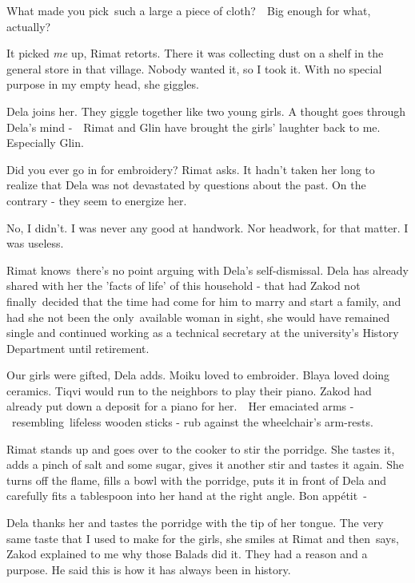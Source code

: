 \documentclass[letterpaper]{article}
\begin{document}
{\textquotedbl}What made you pick~such a large a piece of cloth?\ \ Big enough for what, actually?{\textquotedbl}

{\textquotedbl}It picked \textit{me} up,{\textquotedbl} Rimat retorts. {\textquotedbl}There it was collecting dust on a
shelf in the general store in that village. Nobody wanted it, so I took it. With no special purpose in my empty
head,{\textquotedbl} she giggles.

Dela joins her. They giggle together like two young girls. A thought goes through Dela's mind -\ \ Rimat and Glin have
brought the girls' laughter back to me. Especially Glin. 

{\textquotedbl}Did you ever go in for embroidery?{\textquotedbl} Rimat asks. It hadn't taken her long to realize that
Dela was not devastated by questions about the past. On the contrary - they seem to energize her. 

{\textquotedbl}No, I didn't. I was never any good at handwork. Nor headwork, for that matter. I was
useless.{\textquotedbl} 

Rimat knows~there's no point arguing with Dela's self-dismissal. Dela has already shared with her the 'facts of life' of
this household -  that had Zakod not finally~decided that the time had come for him to marry and start a family, and
had she not been the only~available woman in sight, she would have remained single and continued working as a technical
secretary at the university's History Department until retirement.\ 

{\textquotedbl}Our girls were gifted,{\textquotedbl} Dela adds. {\textquotedbl}Moiku loved to embroider. Blaya loved
doing ceramics. Tiqvi would run to the neighbors to play their piano. Zakod had already put down a deposit for a piano
for her.{\textquotedbl}\ \ Her emaciated arms -\ resembling\ lifeless wooden sticks - rub against the wheelchair's
arm-rests. 

Rimat stands up and goes over to the cooker to stir the porridge. She tastes it, adds a pinch of salt and some sugar,
gives it another stir and tastes it again. She turns off the flame, fills a bowl with the porridge, puts it in front of
Dela and carefully fits a tablespoon into her hand at the right angle. {\textquotedbl}Bon app\'etit\ {}-{\textquotedbl}


Dela thanks her and tastes the porridge with the tip of her tongue. {\textquotedbl}The very same taste that I used to
make for the girls,{\textquotedbl} she smiles at Rimat and then\ says, {\textquotedbl}Zakod explained to me why those
Balads did it. They had a reason and a purpose. He said this is how it has always been in history.{\textquotedbl} \ 
\end{document}
